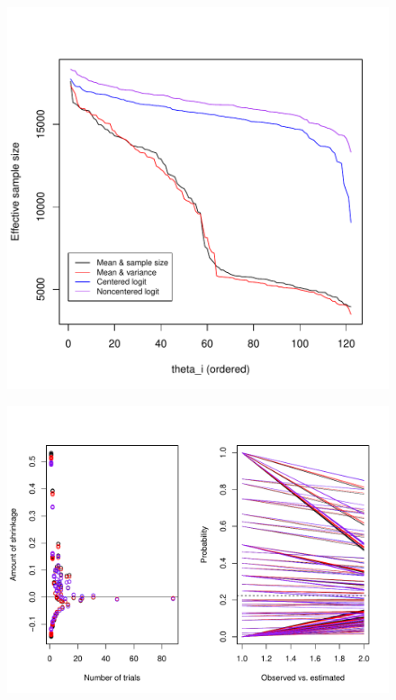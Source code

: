 \documentclass[12pt, oneside, titlepage]{article}   	%
\begin{document}
 \begin{figure}[h]
   \centering
       \includegraphics[page=1,width=.9\textwidth]{../figures/appendix/appendix-1/neff}              
    \caption{   }
 \label{fig:...}
\end{figure}

 \begin{figure}[h]
   \centering
       \includegraphics[page=1,width=.75\textwidth]{../figures/appendix/appendix-1/shrinkageSamplesize}              
    \caption{   }
 \label{fig:...}
\end{figure}
\end{document}
